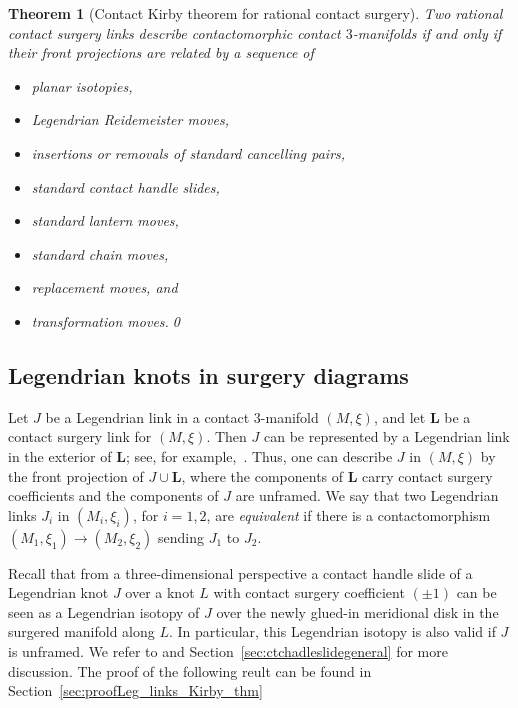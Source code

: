 \documentclass{amsart}
\numberwithin{equation}{section}
\numberwithin{figure}{section}
\newtheorem{theorem}{Theorem}[section]
\theoremstyle{definition}
\theoremstyle{remark}
\let\olddxi\xi %
\renewcommand{\xi}{\olddxi}
\begin{document}
\begin{theorem}[Contact Kirby theorem for rational contact surgery]\label{prop:rational_contact_Kirby}
Two rational contact surgery links describe contactomorphic contact $3$-manifolds if and only if their front projections are related by a sequence of 
\begin{itemize}
    \item planar isotopies,
    \item Legendrian Reidemeister moves,
    \item  insertions or removals of standard cancelling pairs,
    \item standard contact handle slides,
    \item standard lantern moves,
    \item standard chain moves,
    \item replacement moves, and
    \item transformation moves.\qed
\end{itemize}      
\end{theorem}

\subsection{Legendrian knots in surgery diagrams}

Let \(J\) be a Legendrian link in a contact \(3\)-manifold \((M,\xi)\), and let \(\boldsymbol L\) be a contact surgery link for \((M,\xi)\). Then \(J\) can be represented by a Legendrian link in the exterior of $\boldsymbol{L}$; see, for example,~\cite[Section~4.7]{Kegel_thesis}. Thus, one can describe $J$ in \((M,\xi)\) by the front projection of $J\cup \boldsymbol L$, where the components of \(\boldsymbol L\) carry contact surgery coefficients and the components of \(J\) are unframed. We say that two Legendrian links $J_i$ in $(M_i,\xi_i)$, for \(i=1,2\), are \emph{equivalent} if there is a contactomorphism $(M_1,\xi_1)\longrightarrow (M_2,\xi_2)$ sending \(J_1\) to \(J_2\).

Recall that from a three-dimensional perspective a contact handle slide of a Legendrian knot $J$ over a knot $L$ with contact surgery coefficient $(\pm1)$ can be seen as a Legendrian isotopy of $J$ over the newly glued-in meridional disk in the surgered manifold along $L$. In particular, this Legendrian isotopy is also valid if $J$ is unframed. We refer to \cite{Ding_Geiges_slides,Casals_Etnyre_Kegel} and Section~\ref{sec:ctchadleslidegeneral} for more discussion. The proof of the following reult can be found in Section~\ref{sec:proofLeg_links_Kirby_thm}
\end{document}
